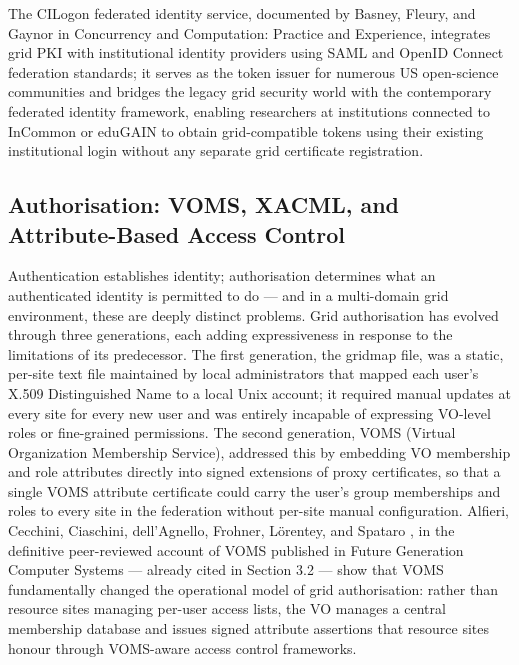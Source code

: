 \documentclass[12pt,a4paper]{report}
\begin{document}
  The CILogon federated identity service, documented by Basney, Fleury, and Gaynor  \parencite{basney2014} in Concurrency and Computation:
   Practice and Experience, integrates grid PKI with institutional identity providers using SAML
  and OpenID Connect federation standards; it serves as the token issuer for numerous US open-science communities and bridges the legacy grid 
  security world with the contemporary federated identity framework, enabling researchers at institutions connected to InCommon or eduGAIN to 
  obtain grid-compatible tokens using their existing institutional login without any separate grid certificate registration.


\subsection*{Authorisation: VOMS, XACML, and Attribute-Based Access Control}
Authentication establishes identity; authorisation determines what an authenticated identity is permitted to do — and in a multi-domain grid environment,
 these are deeply distinct problems. Grid authorisation has evolved through three generations, each adding expressiveness in response to the limitations
  of its predecessor. The first generation, the gridmap file, was a static, per-site text file maintained by local administrators that mapped each 
  user’s X.509 Distinguished Name to a local Unix account; it required manual updates at every site for every new user and was entirely incapable
   of expressing VO-level roles or fine-grained permissions. The second generation, VOMS (Virtual Organization Membership Service), addressed this
    by embedding VO membership and role attributes directly into signed extensions of proxy certificates, so that a single VOMS attribute certificate
     could carry the user’s group memberships and roles to every site in the federation without per-site manual configuration. Alfieri, Cecchini,
      Ciaschini, dell’Agnello, Frohner, Lörentey, and Spataro \parencite{alfieri2005voms}, in the definitive peer-reviewed account of VOMS published in Future Generation 
      Computer Systems — already cited in Section 3.2 — show that VOMS fundamentally changed the operational model of grid authorisation: rather than 
      resource sites managing per-user access lists, the VO manages a central membership database and issues signed attribute assertions that resource 
      sites honour through VOMS-aware access control frameworks. 
      
\end{document}
